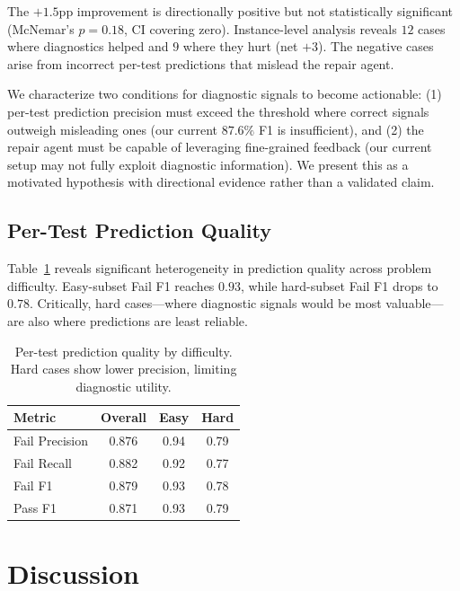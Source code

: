 \documentclass[11pt,a4paper]{article}
\begin{document}
The $+1.5$pp improvement is directionally positive but not statistically significant (McNemar's $p{=}0.18$, CI covering zero). Instance-level analysis reveals $12$ cases where diagnostics helped and $9$ where they hurt (net $+3$). The negative cases arise from incorrect per-test predictions that mislead the repair agent.

We characterize two conditions for diagnostic signals to become actionable: (1) per-test prediction precision must exceed the threshold where correct signals outweigh misleading ones (our current $87.6\%$ F1 is insufficient), and (2) the repair agent must be capable of leveraging fine-grained feedback (our current setup may not fully exploit diagnostic information). We present this as a motivated hypothesis with directional evidence rather than a validated claim.

\subsection{Per-Test Prediction Quality}

Table~\ref{tab:pertest_quality} reveals significant heterogeneity in prediction quality across problem difficulty. Easy-subset Fail F1 reaches $0.93$, while hard-subset Fail F1 drops to $0.78$. Critically, hard cases---where diagnostic signals would be most valuable---are also where predictions are least reliable.

\begin{table}[t]
\centering
\small
\caption{Per-test prediction quality by difficulty. Hard cases show lower precision, limiting diagnostic utility.}
\label{tab:pertest_quality}
\begin{tabular}{lccc}
\toprule
\textbf{Metric} & \textbf{Overall} & \textbf{Easy} & \textbf{Hard} \\
\midrule
Fail Precision & 0.876 & 0.94 & 0.79 \\
Fail Recall & 0.882 & 0.92 & 0.77 \\
Fail F1 & 0.879 & 0.93 & 0.78 \\
Pass F1 & 0.871 & 0.93 & 0.79 \\
\bottomrule
\end{tabular}
\end{table}

\section{Discussion}
\label{sec:discussion}
\end{document}
